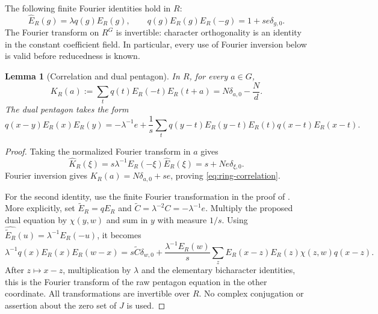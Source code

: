 \documentclass[11pt]{article}
\newtheorem{lemma}[theorem]{Lemma}
\theoremstyle{remark}
\begin{document}
The following finite Fourier identities hold in $R$:
\begin{equation}\label{eq:ring-fourier-reflection}
 \widehat E_R(g)=\lambda q(g)E_R(g),\qquad
 q(g)E_R(g)E_R(-g)=1+se\delta_{g,0}.
\end{equation}
The Fourier transform on $R^G$ is invertible: character orthogonality is
an identity in the constant coefficient field. In particular, every use
of Fourier inversion below is valid before reducedness is known.

\begin{lemma}[Correlation and dual pentagon]\label{lem:ring-correlation}
In $R$, for every $a\in G$,
\begin{equation}\label{eq:ring-correlation}
 K_R(a):=\sum_t q(t)E_R(-t)E_R(t+a)
       =N\delta_{a,0}-\frac Nd.
\end{equation}
The dual pentagon takes the form
\begin{equation}\label{eq:ring-dual-pentagon}
 q(x-y)E_R(x)E_R(y)
 =-\lambda^{-1}e+
 \frac1s\sum_t q(y-t)E_R(y-t)E_R(t)q(x-t)E_R(x-t).
\end{equation}
\end{lemma}
\begin{proof}
Taking the normalized Fourier transform in $a$ gives
\[
 \widehat K_R(\xi)
 =s\lambda^{-1}E_R(-\xi)\widehat E_R(\xi)
 =s+Ne\delta_{\xi,0}.
\]
Fourier inversion gives $K_R(a)=N\delta_{a,0}+se$, proving
\eqref{eq:ring-correlation}.

For the second identity, use the finite Fourier transformation in the proof
of \cite[Theorem~5(iv)]{RW2}. More explicitly, set
$\widetilde E_R=qE_R$ and $\widetilde C=\lambda^{-2}C=-\lambda^{-1}e$.
Multiply the proposed dual equation by $\chi(y,w)$ and sum in $y$ with
measure $1/s$. Using
$\widehat{\widetilde E_R}(u)=\lambda^{-1}E_R(-u)$, it becomes
\[
 \lambda^{-1}q(x)E_R(x)E_R(w-x)
 =s\widetilde C\delta_{w,0}
 +\frac{\lambda^{-1}E_R(w)}s
   \sum_zE_R(x-z)E_R(z)\chi(z,w)q(x-z).
\]
After $z\mapsto x-z$, multiplication by $\lambda$ and the elementary
bicharacter identities, this is the Fourier transform of the raw
pentagon equation in the other coordinate. All transformations are
invertible over $R$. No complex conjugation or assertion about the zero
set of $J$ is used.
\end{proof}
\end{document}
